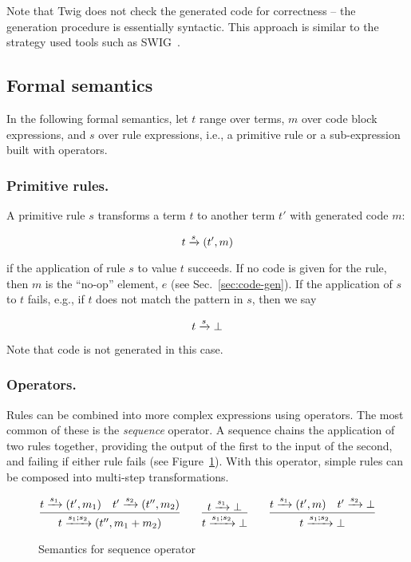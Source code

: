 Note that Twig does not check the generated code for correctness  -- the generation procedure is essentially syntactic. This approach is similar to the strategy used tools such as SWIG~\cite{swig}.

\subsection{Formal semantics}

In the following formal semantics, let $t$ range over terms, $m$ over code block expressions, and $s$ over rule expressions, i.e., a primitive rule or a sub-expression built with operators.

\subsubsection{Primitive rules.}

A primitive rule $s$ transforms a term $t$ to another term $t'$ with generated code $m$:

\[
t \xrightarrow{s} (t',m)
\]

if the application of rule $s$ to value $t$ succeeds. If no code is given for the rule, then $m$ is the ``no-op'' element, $e$ (see Sec.~\ref{sec:code-gen}). If the application of $s$ to $t$ fails, e.g., if $t$ does not match the pattern in $s$, then we say

\[
t \xrightarrow{s} \bot
\]

Note that code is not generated in this case.

\subsubsection{Operators.}

Rules can be combined into more complex expressions using operators. The most common of these is the \emph{sequence} operator. A sequence chains the application of two rules together, providing the output of the first to the input of the second, and failing if either rule fails (see Figure~\ref{semantics:sequence}). With this operator, simple rules can be composed into multi-step transformations.

\begin{figure}[ht]
\[
\infer{t \arr{s_1;s_2} (t'',m_1+m_2)}{t \arr{s_1} (t',m_1) \quad t' \arr{s_2} (t'',m_2)}
\qquad 
\infer{t \arr{s_1;s_2} \bot}{t \arr{s_1} \bot}
\qquad
\infer{t \arr{s_1;s_2} \bot}{t \arr{s_1} (t',m) \quad t' \arr{s_2} \bot}
\]
\caption{Semantics for sequence operator}
\label{semantics:sequence}
\end{figure}

